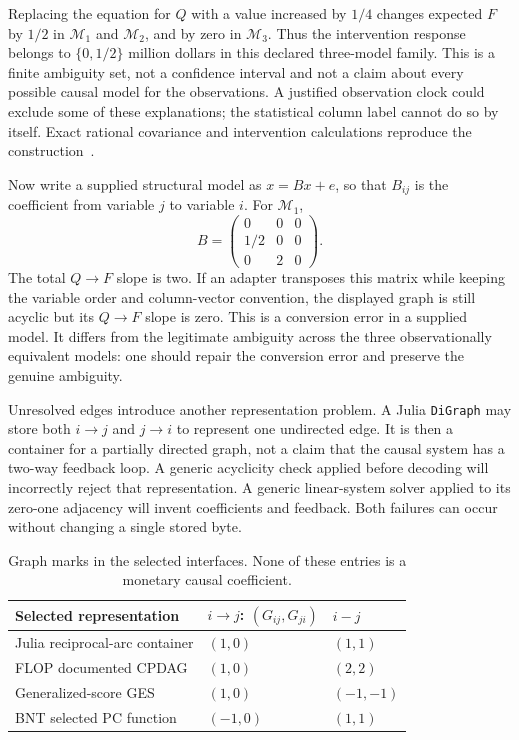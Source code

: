 Replacing the equation for $Q$ with a value increased by $1/4$ changes
expected $F$ by $1/2$ in $\mathcal M_1$ and $\mathcal M_2$, and by zero in
$\mathcal M_3$. Thus the intervention response belongs to
$\{0,1/2\}$ million dollars in this declared three-model family. This is a
finite ambiguity set, not a confidence interval and not a claim about every
possible causal model for the observations. A justified observation clock
could exclude some of these explanations; the statistical column label
cannot do so by itself. Exact rational covariance and intervention
calculations reproduce the construction~\citep{exec13_other_exact}.

Now write a supplied structural model as $x=Bx+e$, so that $B_{ij}$ is the
coefficient from variable $j$ to variable $i$. For $\mathcal M_1$,
\[
 B=\begin{pmatrix}0&0&0\\1/2&0&0\\0&2&0\end{pmatrix}.
\]
The total $Q\to F$ slope is two. If an adapter transposes this matrix while
keeping the variable order and column-vector convention, the displayed graph
is still acyclic but its $Q\to F$ slope is zero. This is a conversion error
in a supplied model. It differs from the legitimate ambiguity across the
three observationally equivalent models: one should repair the conversion
error and preserve the genuine ambiguity.

Unresolved edges introduce another representation problem. A Julia
\texttt{DiGraph} may store both $i\to j$ and $j\to i$ to represent one
undirected edge. It is then a container for a partially directed graph, not a
claim that the causal system has a two-way feedback loop. A generic acyclicity
check applied before decoding will incorrectly reject that representation.
A generic linear-system solver applied to its zero-one adjacency will invent
coefficients and feedback. Both failures can occur without changing a single
stored byte.

\begin{table}[htbp]
\centering\small
\begin{tabular}{lll}
\toprule Selected representation & $i\to j$: $(G_{ij},G_{ji})$ & $i-j$\\
\midrule
Julia reciprocal-arc container & $(1,0)$ & $(1,1)$\\
FLOP documented CPDAG & $(1,0)$ & $(2,2)$\\
Generalized-score GES & $(1,0)$ & $(-1,-1)$\\
BNT selected PC function & $(-1,0)$ & $(1,1)$\\
\bottomrule
\end{tabular}
\caption{Graph marks in the selected interfaces. None of these entries is a
monetary causal coefficient.}
\label{tab:exec13-other-encodings}
\end{table}

